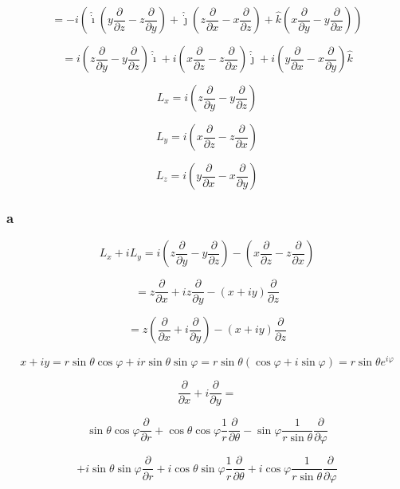 \documentclass[12pt]{article}
\begin{document}
\[
    =
    -i
    \left(
    \hat{\dot{\imath}} \left(y \frac{\partial}{\partial z} - z \frac{\partial}{\partial y}\right)
    + \hat{\dot{\jmath}} \left(z \frac{\partial}{\partial x} - x \frac{\partial}{\partial z}\right)
    + \hat{k} \left(x \frac{\partial}{\partial y} - y \frac{\partial}{\partial x}\right)
    \right)
\]

\[
    = i \left(z \frac{\partial}{\partial y} - y \frac{\partial}{\partial z}\right) \hat{\dot{\imath}}
    + i \left(x \frac{\partial}{\partial z} - z \frac{\partial}{\partial x}\right) \hat{\dot{\jmath}}
    + i \left(y \frac{\partial}{\partial x} - x \frac{\partial}{\partial y}\right) \hat{k}
\]

\[
    L_x = i \left(z \frac{\partial}{\partial y} - y \frac{\partial}{\partial z}\right)
\]

\[
    L_y = i \left(x \frac{\partial}{\partial z} - z \frac{\partial}{\partial x}\right)
\]

\[
    L_z = i \left(y \frac{\partial}{\partial x} - x \frac{\partial}{\partial y}\right)
\]

\subsubsection{a}

\[
    L_x + i L_y = i \left(z \frac{\partial}{\partial y} - y \frac{\partial}{\partial z}\right)
    - \left(x \frac{\partial}{\partial z} - z \frac{\partial}{\partial x}\right)
\]

\[
    = z \frac{\partial}{\partial x} + i z \frac{\partial}{\partial y} - \left(x + i y\right)
    \frac{\partial}{\partial z}
\]

\[
    = z \left(\frac{\partial}{\partial x} + i \frac{\partial}{\partial y}\right)  - \left(x + i y\right)
    \frac{\partial}{\partial z}
\]

\[
    x + i y = r \sin{\theta} \cos{\varphi} + i r \sin{\theta} \sin{\varphi} = r \sin{\theta}
    \left(\cos{\varphi} + i \sin{\varphi}\right) = r \sin{\theta} e^{i \varphi}
\]

\[
    \frac{\partial}{\partial x} + i \frac{\partial}{\partial y} =
\]

\[
    \sin{\theta} \cos{\varphi} \frac{\partial}{\partial r}
    + \cos{\theta} \cos{\varphi} \frac{1}{r} \frac{\partial}{\partial \theta}
    - \sin{\varphi} \frac{1}{r \sin{\theta}} \frac{\partial}{\partial \varphi}
\]

\[
    + i  \sin{\theta} \sin{\varphi} \frac{\partial}{\partial r}
    + i \cos{\theta} \sin{\varphi} \frac{1}{r} \frac{\partial}{\partial \theta}
    + i \cos{\varphi} \frac{1}{r \sin{\theta}} \frac{\partial}{\partial \varphi}
\]
\end{document}

